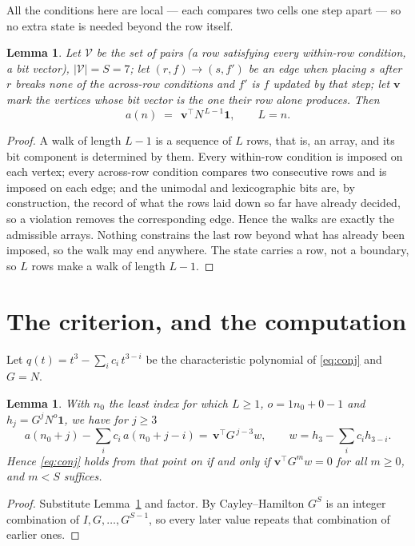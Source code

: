 \documentclass[11pt,a4paper]{article}
\theoremstyle{plain}
\newtheorem{lemma}[theorem]{Lemma}
\theoremstyle{definition}
\begin{document}
All the conditions here are local --- each compares two cells one step apart ---
so no extra state is needed beyond the row itself.

\begin{lemma}\label{lem:walk}
Let $\mathcal V$ be the set of pairs (a row satisfying every within-row condition, a
bit vector), $|\mathcal V|=S=7$; let $(r,f)\to(s,f')$ be an edge when placing $s$ after $r$
breaks none of the across-row conditions and $f'$ is $f$ updated by that step; let
$\mathbf{v}$ mark the vertices whose bit vector is the one their row alone produces.
Then
\[
a(n)\;=\;\,\mathbf{v}^{\!\top}N^{\,L-1}\mathbf{1},\qquad L=n.
\]
\end{lemma}

\begin{proof}
A walk of length $L-1$ is a sequence of $L$ rows, that is, an array, and its bit component
is determined by them. Every within-row condition is imposed on each vertex; every
across-row condition compares two consecutive rows and is imposed on each edge; and the
unimodal and lexicographic bits are, by construction, the record of what the rows laid down
so far have already decided, so a violation removes the corresponding edge. Hence the walks
are exactly the admissible arrays. Nothing constrains the last row beyond what has already
been imposed, so the walk may end anywhere. The state carries a row, not a boundary, so
$L$ rows make a walk of length $L-1$.
\end{proof}

\section{The criterion, and the computation}

Let $q(t)=t^{3}-\sum_i c_i\,t^{3-i}$ be the characteristic polynomial of
\eqref{eq:conj} and $G=N$.

\begin{lemma}\label{lem:crit}
With $n_0$ the least index for which $L\ge1$, $o=1n_0+0-1$ and
$h_j=G^{j}N^{o}\mathbf{1}$, we have for $j\ge3$
\[
a(n_0+j)-\sum_i c_i\,a(n_0+j-i)=\,\mathbf{v}^{\!\top}G^{\,j-3}w,
\qquad w=h_{3}-\sum_i c_ih_{3-i} .
\]
Hence \eqref{eq:conj} holds from that point on if and only if
$\mathbf{v}^{\!\top}G^{m}w=0$ for all $m\ge0$, and $m<S$ suffices.
\end{lemma}

\begin{proof}
Substitute Lemma~\ref{lem:walk} and factor. By Cayley--Hamilton $G^{S}$ is an integer
combination of $I,G,\dots,G^{S-1}$, so every later value repeats that combination of
earlier ones.
\end{proof}
\end{document}
